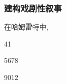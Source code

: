 \documentclass[12pt, a4paper, oneside]{ctexart}
\newcommand{\q}[1]{\begin{questionbox}{}#1\end{questionbox}}
\newcounter{question}[section]
\begin{document}
\subsubsection{建构戏剧性叙事}

在哈姆雷特中, 

\q{41}
\q{5678}
\q{9012}
    


\end{document}

